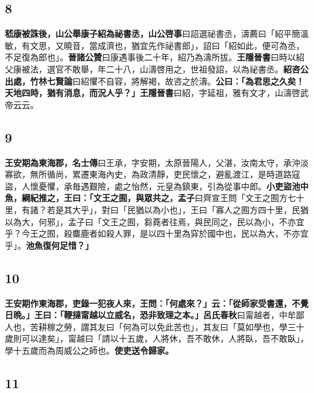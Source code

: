 \subsection*{8}

\textbf{嵇康被誅後，山公舉康子紹為祕書丞，}{\footnotesize \textbf{山公啓事}曰詔選祕書丞，濤薦曰「紹平簡溫敏，有文思，又曉音，當成濟也，猶宜先作祕書郎」，詔曰「紹如此，便可為丞，不足復為郎也」。\textbf{晉諸公贊}曰康遇事後二十年，紹乃為濤所拔。\textbf{王隱晉書}曰時以紹父康被法，選官不敢舉，年二十八，山濤啓用之，世祖發詔，以為祕書丞。}\textbf{紹咨公出處，}{\footnotesize \textbf{竹林七賢論}曰紹懼不自容，將解褐，故咨之於濤。}\textbf{公曰：「為君思之久矣！天地四時，猶有消息，而況人乎？」}{\footnotesize \textbf{王隱晉書}曰紹，字延祖，雅有文才，山濤啓武帝云云。}

\subsection*{9}

\textbf{王安期為東海郡，}{\footnotesize \textbf{名士傳}曰王承，字安期，太原晉陽人，父湛，汝南太守，承沖淡寡欲，無所循尚，累遷東海內史，為政清靜，吏民懷之，避亂渡江，是時道路寇盜，人懷憂懼，承毎遇艱險，處之怡然，元皇為鎮東，引為從事中郎。}\textbf{小吏盜池中魚，綱紀推之，王曰：「文王之囿，與眾共之，}{\footnotesize \textbf{孟子}曰齊宣王問「文王之囿方七十里，有諸？若是其大乎」，對曰「民猶以為小也」，王曰「寡人之囿方四十里，民猶以為大，何邪」，孟子曰「文王之囿，芻蕘者往焉，與民同之，民以為小，不亦宜乎？今王之囿，殺麋鹿者如殺人罪，是以四十里為穽於國中也，民以為大，不亦宜乎」。}\textbf{池魚復何足惜？」}

\subsection*{10}

\textbf{王安期作東海郡，吏錄一犯夜人來，王問：「何處來？」云：「從師家受書還，不覺日晩。」王曰：「鞭撻甯越以立威名，恐非致理之本。」}{\footnotesize \textbf{呂氏春秋}曰甯越者，中牟鄙人也，苦耕稼之勞，謂其友曰「何為可以免此苦也」，其友曰「莫如學也，學三十歲則可以達矣」，甯越曰「請以十五歲，人將休，吾不敢休，人將臥，吾不敢臥」，學十五歲而為周威公之師也。}\textbf{使吏送令歸家。}

\subsection*{11}

